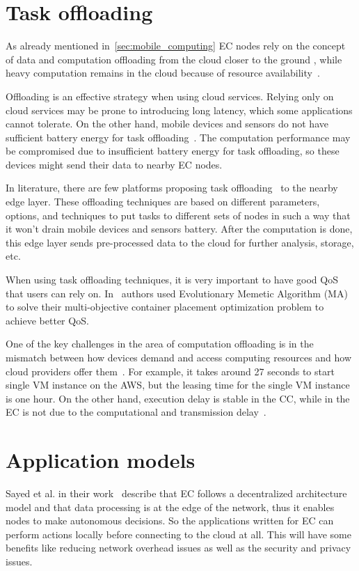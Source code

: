 \section{Task offloading}\label{sec:task_offloading}
%
As already mentioned in~\ref{sec:mobile_computing} EC nodes rely on the concept of data and computation offloading from the cloud closer to the ground \cite{KhuneP19}, while heavy computation remains in the cloud because of resource availability~\cite{NingLSY20}. 

Offloading is an effective strategy when using cloud services. Relying only on cloud services may be prone to introducing long latency, which some applications cannot tolerate. On the other hand, mobile devices and sensors do not have sufficient battery energy for task offloading~\cite{MaoZL16}. The computation performance may be compromised due to insufficient battery energy for task offloading, so these devices might send their data to nearby EC nodes.

In literature, there are few platforms proposing task offloading~\cite{ShiHPANZ14, KhuneP19, ChenHLLW15, LinLJL19, JiangCGZW19, MaoZL16} to the nearby edge layer. These offloading techniques are based on different parameters, options, and techniques to put tasks to different sets of nodes in such a way that it won't drain mobile devices and sensors battery. After the computation is done, this edge layer sends pre-processed data to the cloud for further analysis, storage, etc.

When using task offloading techniques, it is very important to have good QoS that users can rely on. In~\cite{SamiM20} authors used Evolutionary Memetic Algorithm (MA) to solve their multi-objective container placement optimization problem to achieve better QoS.

One of the key challenges in the area of computation offloading is in the mismatch between how devices demand and access computing resources and how cloud providers offer them~\cite{ShiHPANZ14}. For example, it takes around 27 seconds to start single VM instance on the AWS, but the leasing time for the single VM instance is one hour. On the other hand, execution delay is stable in the CC, while in the EC is not due to the computational and transmission delay~\cite{WangZMHNW18}.
%
%
\section{Application models}\label{sec:applications}
%
Sayed et al. in their work~\cite{El-SayedSPPGML18} describe that EC follows a decentralized architecture model and that data processing is at the edge of the network, thus it enables nodes to make autonomous decisions.  So the applications written for EC can perform actions locally before connecting to the cloud at all. This will have some benefits like reducing network overhead issues as well as the security and privacy issues. 

